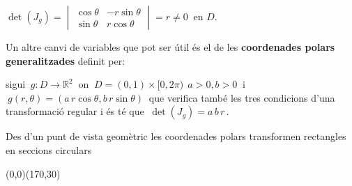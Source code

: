 \documentclass[12pt]{article}
\newcommand{\R}{\mathbb{R}}
\begin{document}
\hspace*{1cm} $\det(J_g)=
\begin{vmatrix}
\cos \theta & -r \sin \theta\\ \sin \theta & r \cos \theta
\end{vmatrix}=r\not=0\ $ en $D$.

Un altre canvi de variables que pot ser {\'u}til {\'e}s el de les
\textbf{coordenades polars generalitzades} definit per:

sigui $\ g:D\to \R^2\ $ on $\ D=(0,1)\times[0,2\pi)\ \ a>0,b>0\ $ i
$\ g(r,\theta)=(a\, r\cos \theta,b\, r\sin \theta)\ $ que verifica
tamb{\'e} les tres condicions d'una transformaci{\'o} regular i {\'e}s t{\'e} que $\
\det(J_g)=a\,
b\, r\,.$\\

\begin{observacio}
Des d'un punt de vista geom{\`e}tric les coordenades polars transformen
rectangles en seccions circulars
\end{observacio}

\vspace*{2.5cm}
\begin{center}
\begin{picture}(0,0)(170,30)
\hspace{3cm}
\end{picture}
\end{center}
\end{document}
